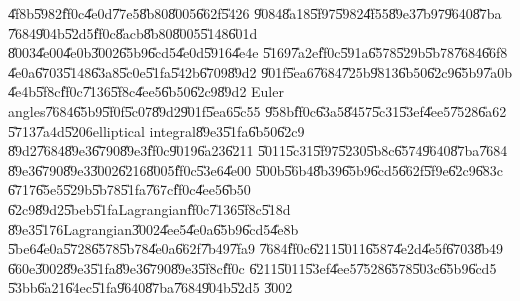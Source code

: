 \documentclass[12pt,a4paper]{article}
\begin{document}
\U{4f8b}\U{5982}\U{ff0c}\U{4e0d}\U{77e5}\U{8b80}\U{8005}\U{662f}\U{5426}%
\U{9084}\U{8a18}\U{5f97}\U{5982}\U{4f55}\U{89e3}\U{7b97}\U{9640}\U{87ba}%
\U{7684}\U{904b}\U{52d5}\U{ff0c}\U{8acb}\U{8b80}\U{8005}\U{5148}\U{601d}%
\U{8003}\U{4e00}\U{4e0b}\U{3002}\U{65b9}\U{6cd5}\U{4e0d}\U{5916}\U{4e4e}%
\U{5169}\U{7a2e}\U{ff0c}\U{591a}\U{6578}\U{529b}\U{5b78}\U{7684}\U{66f8}%
\U{4e0a}\U{6703}\U{5148}\U{63a8}\U{5c0e}\U{51fa}\U{542b}\U{6709}\U{89d2}%
\U{901f}\U{5ea6}\U{7684}\U{725b}\U{9813}\U{6b50}\U{62c9}\U{65b9}\U{7a0b}%
\U{4e4b}\U{5f8c}\U{ff0c}\U{7136}\U{5f8c}\U{4ee5}\U{6b50}\U{62c9}\U{89d2}%
Euler angles\U{7684}\U{65b9}\U{5f0f}\U{5c07}\U{89d2}\U{901f}\U{5ea6}\U{5c55}%
\U{958b}\U{ff0c}\U{63a5}\U{8457}\U{5c31}\U{53ef}\U{4ee5}\U{7528}\U{6a62}%
\U{5713}\U{7a4d}\U{5206}elliptical integral\U{89e3}\U{51fa}\U{6b50}\U{62c9}%
\U{89d2}\U{7684}\U{89e3}\U{6790}\U{89e3}\U{ff0c}\U{9019}\U{6a23}\U{6211}%
\U{5011}\U{5c31}\U{5f97}\U{5230}\U{5b8c}\U{6574}\U{9640}\U{87ba}\U{7684}%
\U{89e3}\U{6790}\U{89e3}\U{3002}\U{6216}\U{8005}\U{ff0c}\U{53e6}\U{4e00}%
\U{500b}\U{56b4}\U{8b39}\U{65b9}\U{6cd5}\U{662f}\U{5f9e}\U{62c9}\U{683c}%
\U{6717}\U{65e5}\U{529b}\U{5b78}\U{51fa}\U{767c}\U{ff0c}\U{4ee5}\U{6b50}%
\U{62c9}\U{89d2}\U{5beb}\U{51fa}Lagrangian\U{ff0c}\U{7136}\U{5f8c}\U{518d}%
\U{89e3}\U{5176}Lagrangian\U{3002}\U{4ee5}\U{4e0a}\U{65b9}\U{6cd5}\U{4e8b}%
\U{5be6}\U{4e0a}\U{5728}\U{6578}\U{5b78}\U{4e0a}\U{662f}\U{7b49}\U{7fa9}%
\U{7684}\U{ff0c}\U{6211}\U{5011}\U{6587}\U{4e2d}\U{4e5f}\U{6703}\U{8b49}%
\U{660e}\U{3002}\U{89e3}\U{51fa}\U{89e3}\U{6790}\U{89e3}\U{5f8c}\U{ff0c}%
\U{6211}\U{5011}\U{53ef}\U{4ee5}\U{7528}\U{6578}\U{503c}\U{65b9}\U{6cd5}%
\U{53bb}\U{6a21}\U{64ec}\U{51fa}\U{9640}\U{87ba}\U{7684}\U{904b}\U{52d5}%
\U{3002}

\bigskip
\end{document}
